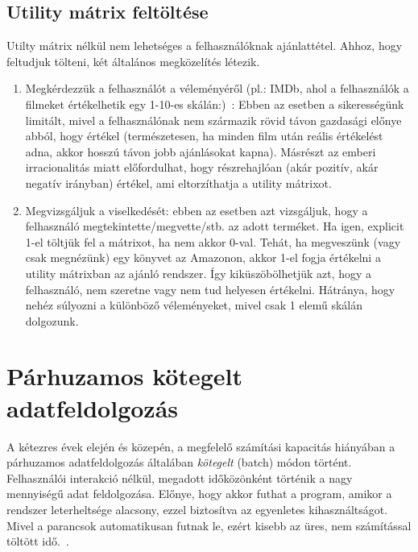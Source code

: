 \documentclass[a4paper,12pt]{article}
\begin{document}
\subsection{Utility mátrix feltöltése}
Utilty mátrix nélkül nem lehetséges a felhasználóknak ajánlattétel. Ahhoz, hogy feltudjuk tölteni, két általános megközelítés létezik.
\begin{enumerate}
\item Megkérdezzük a felhasználót a véleményéről (pl.: IMDb, ahol a felhasználók a filmeket értékelhetik egy 1-10-es skálán:)~\cite{imdb}: Ebben az esetben a sikerességünk limitált, mivel a felhasználónak nem származik rövid távon gazdasági előnye abból, hogy értékel (természetesen, ha minden film után reális értékelést adna, akkor hosszú távon jobb ajánlásokat kapna). Másrészt az emberi irracionalitás miatt előfordulhat, hogy részrehajlóan (akár pozitív, akár negatív irányban) értékel, ami eltorzíthatja a utility mátrixot. ~\cite{introspection}
\item Megvizsgáljuk a viselkedését: ebben az esetben azt vizsgáljuk, hogy a felhasználó megtekintette/megvette/stb. az adott terméket. Ha igen, explicit 1-el töltjük fel a mátrixot, ha nem akkor 0-val. Tehát, ha megveszünk (vagy csak megnézünk) egy könyvet az Amazonon, akkor 1-el fogja értékelni a utility mátrixban az ajánló rendszer. Így kiküszöbölhetjük azt, hogy a felhasználó, nem szeretne vagy nem tud helyesen értékelni. Hátránya, hogy nehéz súlyozni a különböző véleményeket, mivel csak 1 elemű skálán dolgozunk.
\end{enumerate}

\section{Párhuzamos kötegelt adatfeldolgozás}
A kétezres évek elején és közepén, a megfelelő számítási kapacitás hiányában a párhuzamos adatfeldolgozás általában \textsl{kötegelt} (batch) módon történt. Felhasználói interakció nélkül, megadott időközönként történik a nagy mennyiségű adat feldolgozása. Előnye, hogy akkor futhat a program, amikor a rendszer leterheltsége alacsony, ezzel biztosítva az egyenletes kihasználtságot. Mivel a parancsok automatikusan futnak le, ezért kisebb az üres, nem számítással töltött idő.~\cite{batch}.
\end{document}
